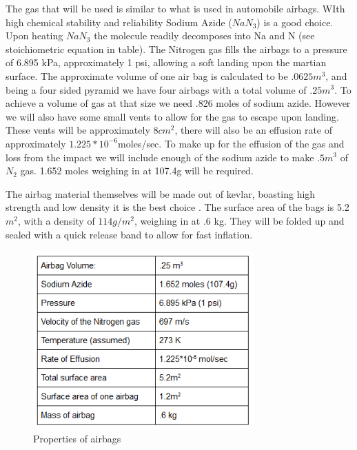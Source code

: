 \documentclass[%
 portrait,
 aapm,
 mph,%
 amsmath,amssymb,
 reprint,%
]{revtex4-2}
\begin{document}
The gas that will be used is similar to what is used in automobile airbags.  WIth high chemical stability and reliability Sodium Azide (\begin{math}NaN_3\end{math}) is a good choice.  Upon heating \begin{math}NaN_3\end{math} the molecule readily decomposes into Na and N (see stoichiometric equation in table).  The Nitrogen gas fills the airbags to a pressure of 6.895 kPa, approximately 1 psi, allowing a soft landing upon the martian surface.  The approximate volume of one air bag is calculated to be \begin{math} .0625 m^3 \end{math}, and being a four sided pyramid we have four airbags with a total volume of \begin{math} .25m^3 \end{math}.  To achieve a volume of gas at that size we need .826 moles of sodium azide.  However we will also have some small vents to allow for the gas to escape upon landing.  These vents will be approximately \begin{math} 8cm^2 \end{math}, there will also be an effusion rate of approximately \begin{math} 1.225*10^{-6} \end{math}moles/sec.  To make up for the effusion of the gas and loss from the impact we will include enough of the sodium azide to make \begin{math} .5 m^3 \end{math}  of \begin{math} N_2 \end{math} gas.  1.652 moles weighing in at 107.4g will be required.

The airbag material themselves will be made out of kevlar, boasting high strength and low density it is the best choice \cite{JPL:001}.  The surface area of the bags is 5.2 \begin{math} m^2 \end{math}, with a density of \begin{math}  114g/m^2\end{math}, weighing in at .6 kg.  They will be folded up and sealed with a quick release band to allow for fast inflation.
\begin{figure}[h!]
  \includegraphics[width=240pt]{DescentandLanding/airbagSpecs.png}
   \caption{Properties of airbags \cite{wiki:005}}
\end{figure} 
\end{document}
